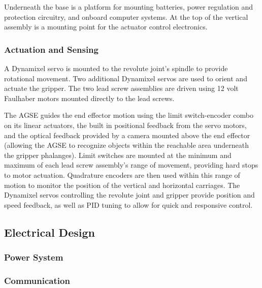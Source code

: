Underneath the base is a platform for mounting batteries, power regulation and protection circuitry, and onboard computer systems.  At the top of the vertical assembly is a mounting point for the actuator control electronics.


\subsubsection{Actuation and Sensing}

A Dynamixel servo is mounted to the revolute joint's spindle to provide rotational movement. Two additional Dynamixel servos are used to orient and actuate the gripper. The two lead screw assemblies are driven using 12 volt Faulhaber motors mounted directly to the lead screws.

The AGSE guides the end effector motion using the limit switch-encoder combo on its linear actuators, the built in positional feedback from the servo motors, and the optical feedback provided by a camera mounted above the end effector (allowing the AGSE to recognize objects within the reachable area underneath the gripper phalanges).  Limit switches are mounted at the minimum and maximum of each lead screw assembly's range of movement, providing hard stops to motor actuation.  Quadrature encoders are then used within this range of motion to monitor the position of the vertical and horizontal carriages. The Dynamixel servos controlling the revolute joint and gripper provide position and speed feedback, as well as PID tuning to allow for quick and responsive control.


\subsection{Electrical Design}


\subsubsection{Power System}
%


\subsubsection{Communication}


